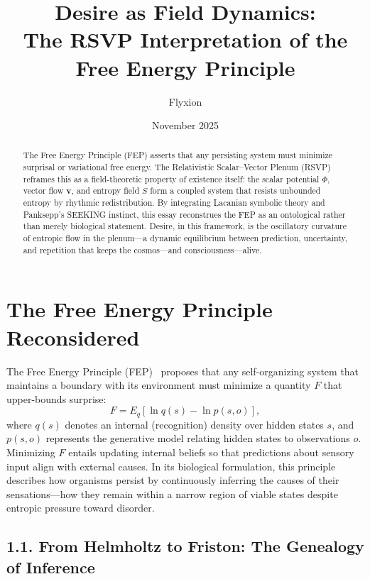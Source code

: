 \documentclass[12pt,a4paper]{article}
\title{\Huge\textbf{Desire as Field Dynamics:}\\[0.4em]
\Large The RSVP Interpretation of the Free Energy Principle}
\author{Flyxion}
\date{November 2025}
\begin{document}
\maketitle

\begin{abstract}
The Free Energy Principle (FEP) asserts that any persisting system must minimize surprisal or variational free energy. The Relativistic Scalar--Vector Plenum (RSVP) reframes this as a field-theoretic property of existence itself: the scalar potential $\Phi$, vector flow $\mathbf{v}$, and entropy field $S$ form a coupled system that resists unbounded entropy by rhythmic redistribution. By integrating Lacanian symbolic theory and Panksepp’s SEEKING instinct, this essay reconstrues the FEP as an ontological rather than merely biological statement. Desire, in this framework, is the oscillatory curvature of entropic flow in the plenum---a dynamic equilibrium between prediction, uncertainty, and repetition that keeps the cosmos---and consciousness---alive.
\end{abstract}


\section{The Free Energy Principle Reconsidered}

The Free Energy Principle (FEP)~\citep{friston2010free,friston2022principle} proposes that any self-organizing system that maintains a boundary with its environment must minimize a quantity \(F\) that upper-bounds surprise:
\[
F = E_q[\ln q(s) - \ln p(s,o)],
\]
where \(q(s)\) denotes an internal (recognition) density over hidden states \(s\), and \(p(s,o)\) represents the generative model relating hidden states to observations \(o\).  
Minimizing \(F\) entails updating internal beliefs so that predictions about sensory input align with external causes. In its biological formulation, this principle describes how organisms persist by continuously inferring the causes of their sensations—how they remain within a narrow region of viable states despite entropic pressure toward disorder.

\subsection{1.1. From Helmholtz to Friston: The Genealogy of Inference}
\end{document}
